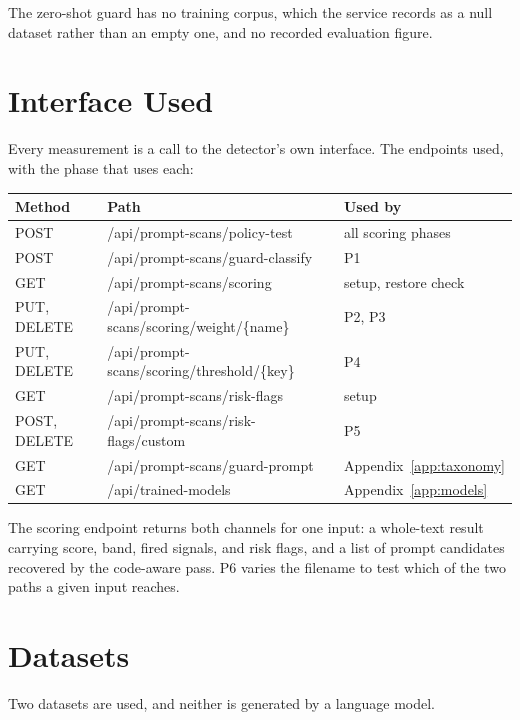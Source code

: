 \documentclass[conference]{IEEEtran}
\begin{document}
The zero-shot guard has no training corpus, which the service records as a null
dataset rather than an empty one, and no recorded evaluation figure.

\section{Interface Used}\label{app:api}

Every measurement is a call to the detector's own interface. The endpoints
used, with the phase that uses each:

\begin{table}[t]
\centering
\footnotesize
\begin{tabular}{llp{6cm}}
\toprule
Method & Path & Used by \\
\midrule
POST & /api/prompt-scans/policy-test & all scoring phases \\
POST & /api/prompt-scans/guard-classify & P1 \\
GET & /api/prompt-scans/scoring & setup, restore check \\
PUT, DELETE & /api/prompt-scans/scoring/weight/\{name\} & P2, P3 \\
PUT, DELETE & /api/prompt-scans/scoring/threshold/\{key\} & P4 \\
GET & /api/prompt-scans/risk-flags & setup \\
POST, DELETE & /api/prompt-scans/risk-flags/custom & P5 \\
GET & /api/prompt-scans/guard-prompt & Appendix~\ref{app:taxonomy} \\
GET & /api/trained-models & Appendix~\ref{app:models} \\
\bottomrule
\end{tabular}
\end{table}

The scoring endpoint returns both channels for one input: a whole-text result
carrying score, band, fired signals, and risk flags, and a list of prompt
candidates recovered by the code-aware pass. P6 varies the filename to test
which of the two paths a given input reaches.

\section{Datasets}\label{app:datasets}

Two datasets are used, and neither is generated by a language model.
\end{document}

